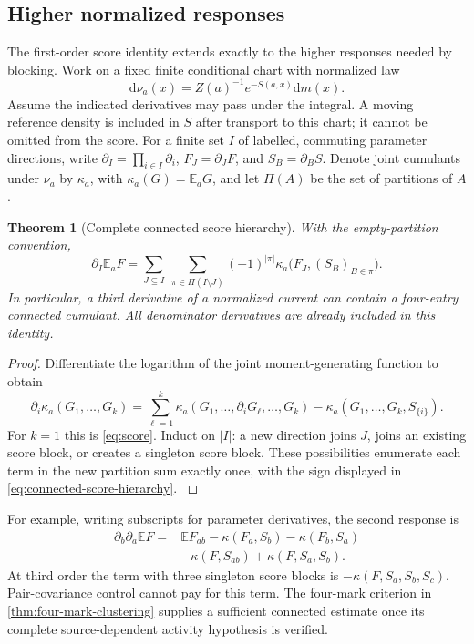 \documentclass[11pt,oneside,openany]{book}
\newtheorem{theorem}{Theorem}[chapter]
\theoremstyle{definition}
\theoremstyle{remark}
\newcommand{\E}{\mathbb E}
\newcommand{\dd}{\mathrm d}
\newcommand{\src}[2]{\cite[#2]{#1}}
\begin{document}
\subsection{Higher normalized responses}
The first-order score identity extends exactly to the higher responses
needed by blocking. Work on a fixed finite conditional chart with
normalized law
\[
\dd\nu_a(x)=Z(a)^{-1}e^{-S(a,x)}\dd m(x).
\]
Assume the indicated derivatives may pass under the integral. A moving
reference density is included in $S$ after transport to this chart; it
cannot be omitted from the score. For a finite set $I$ of labelled,
commuting parameter directions, write $\partial_I=\prod_{i\in I}\partial_i$,
$F_J=\partial_JF$, and $S_B=\partial_BS$. Denote joint cumulants under
$\nu_a$ by $\kappa_a$, with $\kappa_a(G)=\E_aG$, and let $\Pi(A)$ be
the set of partitions of $A$.

\begin{theorem}[Complete connected score hierarchy]
\label{thm:connected-score-hierarchy}
With the empty-partition convention,
\begin{equation}\label{eq:connected-score-hierarchy}
\partial_I\E_aF
=\sum_{J\subseteq I}\ \sum_{\pi\in\Pi(I\setminus J)}
 (-1)^{|\pi|}\kappa_a\bigl(F_J,(S_B)_{B\in\pi}\bigr).
\end{equation}
In particular, a third derivative of a normalized current can contain a
four-entry connected cumulant. All denominator derivatives are already
included in this identity.
\end{theorem}
\begin{proof}
Differentiate the logarithm of the joint moment-generating function to
obtain
\[
\partial_i\kappa_a(G_1,\ldots,G_k)
=\sum_{\ell=1}^k\kappa_a(G_1,\ldots,\partial_iG_\ell,\ldots,G_k)
 -\kappa_a(G_1,\ldots,G_k,S_{\{i\}}).
\]
For $k=1$ this is \cref{eq:score}. Induct on $|I|$: a new direction
joins $J$, joins an existing score block, or creates a singleton score
block. These possibilities enumerate each term in the new partition
sum exactly once, with the sign displayed in
\cref{eq:connected-score-hierarchy}. \src{F8}{V60}
\end{proof}

For example, writing subscripts for parameter derivatives, the second
response is
\begin{equation}\label{eq:score-second-explicit}
\begin{aligned}
\partial_b\partial_a\E F
={}&\E F_{ab}-\kappa(F_a,S_b)-\kappa(F_b,S_a)\\
 &-\kappa(F,S_{ab})+\kappa(F,S_a,S_b).
\end{aligned}
\end{equation}
At third order the term with three singleton score blocks is
$-\kappa(F,S_a,S_b,S_c)$. Pair-covariance control cannot pay for this
term. The four-mark criterion in \cref{thm:four-mark-clustering} supplies
a sufficient connected estimate once its complete source-dependent
activity hypothesis is verified.
\end{document}
